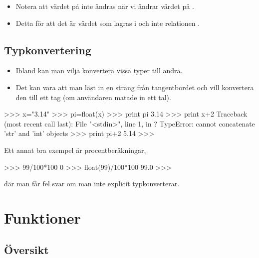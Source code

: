 \documentclass{beamer}
\begin{document}
\begin{frame}{\insertsubsectionhead}
  \begin{itemize}
    \item Notera att värdet på  inte ändras när vi ändrar värdet på 
      .
    \item Detta för att det är värdet  som lagras i  och inte 
      relationen .
  \end{itemize}
\end{frame}

\subsection{Typkonvertering}

\begin{frame}{\insertsubsectionhead}
  \begin{itemize}
    \item Ibland kan man vilja konvertera vissa typer till andra.
    \item Det kan vara att man läst in en sträng från tangentbordet och vill 
      konvertera den till ett tag (om användaren matade in ett tal).
  \end{itemize}
\end{frame}

\begin{frame}[fragile]{\insertsubsectionhead}
  \begin{terminal}
>>> x="3.14"
>>> pi=float(x)
>>> print pi
3.14
>>> print x+2
Traceback (most recent call last):
  File "<stdin>", line 1, in ?
  TypeError: cannot concatenate 'str' and 'int' objects
>>> print pi+2
5.14
>>>
  \end{terminal}
\end{frame}

\begin{frame}[fragile]{\insertsubsectionhead}
  Ett annat bra exempel är procentberäkningar,
  \begin{terminal}
>>> 99/100*100
0
>>> float(99)/100*100
99.0
>>>
  \end{terminal}
  där man får fel svar om man inte explicit typkonverterar.
\end{frame}


\section{Funktioner}

\subsection{Översikt}
\end{document}
